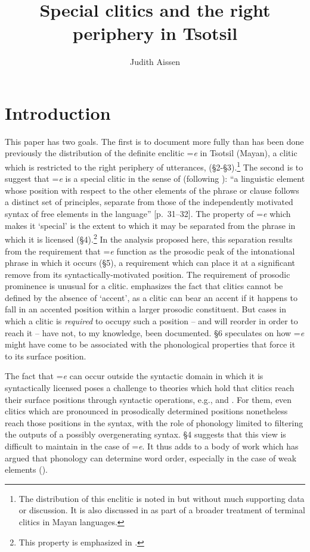 \documentclass[output=paper,
modfonts
]{LSP/langsci}
\author{Judith Aissen\affiliation{University of California, Santa Cruz} }
\title{Special clitics and the right  periphery in Tsotsil}
\begin{document}
\maketitle

\section{Introduction}
This paper has two goals. The first is to document more fully than has been done previously the distribution of the definite enclitic =\emph{e} in Tsotsil (Mayan), a clitic which is restricted to the right periphery of utterances, (\S2-\S3).\footnote
{The distribution of this enclitic is noted in \citet[p.~61]{aissen1992} but without much supporting data or discussion. 
It is also discussed in \cite{skopeteas2010} as part of a broader treatment of terminal clitics in Mayan languages.}
The second  is to suggest that =\emph{e} is a special clitic in the sense of \citet{anderson2005} (following \citealt{zwicky1977}): 
``a linguistic element whose position with respect to the other elements of the phrase or clause follows a distinct set of principles, separate from those of the independently motivated syntax of free elements in the language'' [p.~31--32]. 
The property of =\emph{e} which makes it `special' is the extent to which it may be separated from the phrase in which it is licensed (\S4).\footnote
{This property is emphasized in \citet{skopeteas2010}.}
In the analysis proposed here, this separation results from the requirement that =\emph{e} function as the prosodic peak of the intonational phrase in which it occurs (\S5),
 a requirement which can place it at a significant remove from its syntactically-motivated position.  The requirement of prosodic prominence
 is unusual for a clitic. \citet{anderson2005} emphasizes the fact that clitics cannot be defined by the absence of `accent', as a clitic
 can bear an accent if it happens to fall in an accented position within a larger prosodic constituent. 
 But cases in which a clitic is \emph{required} to occupy such a position  --  and will reorder
 in order to reach it  --  have not, to my knowledge, been documented. \S6 speculates on how =\emph{e} might have come to 
 be associated with the phonological properties that force it to its surface position. 
 
The fact that =\emph{e} can occur outside the syntactic domain in which it is syntactically licensed 
poses a challenge to theories  which hold that clitics reach their surface positions through syntactic operations, e.g., \citet{boskovic2000} and \citet{otero2011}. 
For them, even clitics which are pronounced in prosodically determined positions nonetheless reach those positions in the syntax, with the role of phonology
 limited to filtering the outputs of a possibly overgenerating syntax. \S4 suggests that this view is difficult to maintain in the case of =\emph{e}.
 It thus adds to a body of work which has argued that phonology can determine word order, especially in the case of weak elements 
 (\citealt{halpern1995, chung2003, agbayani2010, agbayani2015, bennettetal}).
   
\end{document}
